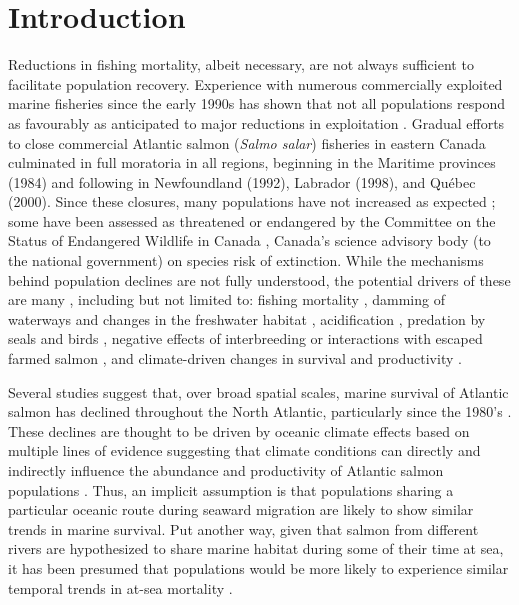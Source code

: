 \documentclass[12pt]{article}
\begin{document}

\section*{Introduction} %


Reductions in fishing mortality, albeit necessary, are not always sufficient
to facilitate population recovery. Experience with numerous commercially
exploited marine fisheries since the early 1990s has shown that not all
populations respond as favourably as anticipated to major reductions in
exploitation \citep{Hutchings2017}. Gradual efforts to close commercial
Atlantic salmon (\emph{Salmo salar}) fisheries in eastern Canada culminated in
full moratoria in all regions, beginning in the Maritime provinces (1984) and
following in Newfoundland (1992), Labrador (1998), and Qu\'{e}bec (2000). Since
these closures, many populations have not increased as 
expected \citep{Dempson2004, ICES2019}; some 
have been assessed as threatened or endangered by the 
Committee on the Status of Endangered Wildlife in Canada \citep[][]{Cosewic2010}, 
Canada's science advisory body (to the national government) on
species risk of extinction.
While the mechanisms behind population declines are not fully understood, the potential
drivers of these are many \citep[see ][for a detailed discussion of possible
causes]{Cairns2001}, including but not limited to: fishing mortality \citep{Dempson2004}, 
damming of waterways and changes in the freshwater habitat \citep{Dunfield1985,Clarke2014a}, 
acidification \citep[particularly in Nova Scotia's Southern Uplands, see][]{Gibson2010}, 
predation by seals and birds \citep{Cairns2000}, negative
effects of interbreeding or interactions with escaped farmed salmon
\citep{Keyser2018}, and climate-driven changes in survival and productivity \citep{Mills2013}.

Several studies suggest that, over broad spatial scales,
marine survival of Atlantic salmon has declined throughout the North Atlantic,
particularly since the 1980's \citep{Massiot-Granier2014,ICES2019,Olmos2019}.
These declines are thought to be driven by oceanic climate effects 
based on multiple lines of evidence suggesting that climate conditions can directly and
indirectly influence the abundance and productivity of Atlantic salmon
populations \citep{Mills2013,Almodovar2019,Olmos2020}.
Thus, an implicit assumption is that populations sharing a particular oceanic
route during seaward migration are likely to show similar trends in marine
survival. 
Put another way, given that salmon from different rivers 
are hypothesized to share marine habitat during some of their time at sea, it
has been presumed that populations would be more likely to experience similar temporal trends in
at-sea mortality \citep{Friedland1993, Friedland1998, Russell2012}.  
\end{document}
